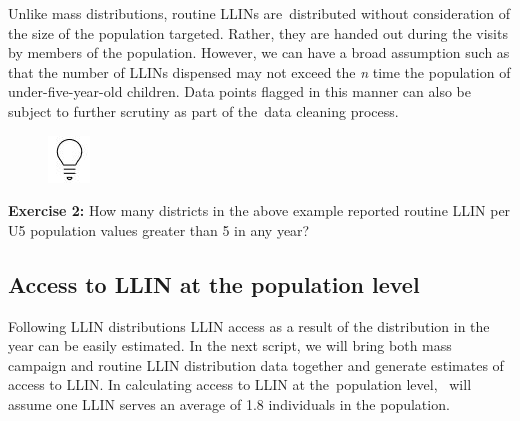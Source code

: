 \documentclass[
  letterpaper,
  DIV=11,
  numbers=noendperiod]{scrreprt}
\begin{document}
Unlike mass distributions, routine LLINs are~distributed without
consideration of the size of the population targeted. Rather, they are
handed out during the visits by members of the population. However, we
can have a broad assumption such as that the number of LLINs dispensed
may not exceed the \emph{n} time the population of under-five-year-old
children. Data points flagged in this manner can also be subject to
further scrutiny as part of the~data cleaning process.

\begin{figure}

\includegraphics{plots/image_01.png} \hfill{}

\end{figure}

\textbf{Exercise 2:} How many districts in the above example reported
routine LLIN per U5 population values greater than 5 in any year?

\hypertarget{access-to-llin-at-the-population-level}{%
\subsection{\texorpdfstring{\textbf{Access to LLIN at the population
level}}{Access to LLIN at the population level}}\label{access-to-llin-at-the-population-level}}

Following LLIN distributions LLIN access as a result of the distribution
in the year can be easily estimated. In the next script, we will bring
both mass campaign and routine LLIN distribution data together and
generate estimates of access to LLIN. In calculating access to LLIN at
the~population level,~ will assume one LLIN serves an average of 1.8
individuals in the population.
\end{document}
